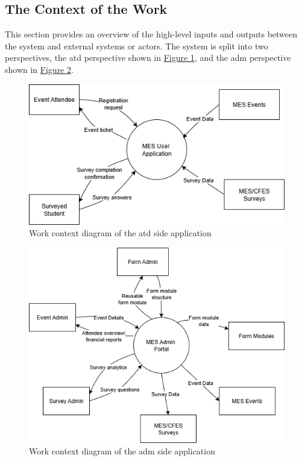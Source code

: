 \documentclass[12pt]{article}
\begin{document}
\subsection{The Context of the Work}

This section provides an overview of the high-level inputs and outputs between the system and external systems or
actors.
The system is split into two perspectives, the \gls{atd} perspective shown in \hyperref[fig:workcontextuser]{Figure
\ref{fig:workcontextuser}}, and the \gls{adm} perspective shown in \hyperref[fig:workcontextadmin]{Figure
\ref{fig:workcontextadmin}}.

\begin{center}
\begin{figure}[H]
    \centering
    \includegraphics[width=1\linewidth]{images/work_context_user.png}
    \caption{Work context diagram of the \gls{atd} side application}\label{fig:workcontextuser}
\end{figure}
\end{center}

\begin{center}
\begin{figure}[H]
    \centering
    \includegraphics[width=1\linewidth]{images/work_context_admin.png}
    \caption{Work context diagram of the \gls{adm} side application}\label{fig:workcontextadmin}
\end{figure}
\end{center}
\end{document}
